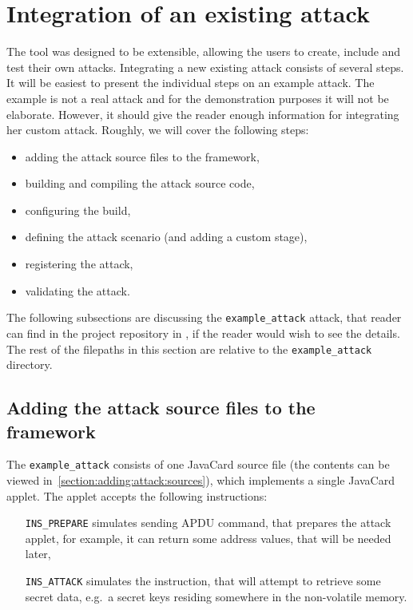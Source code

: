     \section{\label{sec:attack-recipe}Integration of an existing attack}
        The tool was designed to be extensible, allowing the users to create, include and test their own attacks. Integrating a new existing attack consists of several steps. It will be easiest to present the individual steps on an example attack. The example is not a real attack and for the demonstration purposes it will not be elaborate. However, it should give the reader enough information for integrating her custom attack. Roughly, we will cover the following steps:

        \begin{itemize}
            \item adding the attack source files to the framework,
            \item building and compiling the attack source code,
            \item configuring the build,
            \item defining the attack scenario (and adding a custom stage),
            \item registering the attack,
            \item validating the attack.
        \end{itemize}

        The following subsections are discussing the \texttt{example_attack} attack, that reader can find in the project repository in , if the reader would wish to see the details. The rest of the filepaths in this section are relative to the \texttt{example_attack} directory.%

        \subsection{Adding the attack source files to the framework}\label{subsec:recipe:add:sources}

        The \texttt{example_attack} consists of one JavaCard source file  (the contents can be viewed in~\ref{section:adding:attack:sources}), which implements a single JavaCard applet. The applet accepts the following instructions:

            \begin{enumerate}[align=left]
                \item[\texttt{INS_PREPARE}] simulates sending APDU command, that prepares the attack applet, for example, it can return some address values, that will be needed later,
                \item[\texttt{INS_ATTACK}] simulates the instruction, that will attempt to retrieve some secret data, e.g.\ a secret keys residing somewhere in the non-volatile memory.
            \end{enumerate}
            

